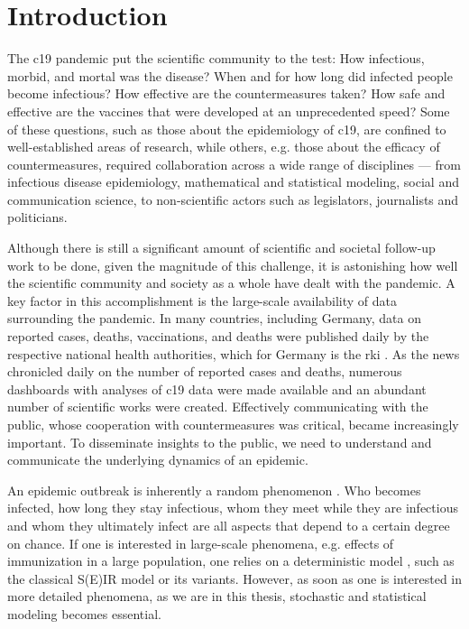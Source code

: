 \chapter{Introduction}
\label{cha:introduction}

The \gls{c19} pandemic put the scientific community to the test: How infectious, morbid, and mortal was the disease? When and for how long did infected people become infectious? How effective are the countermeasures taken? How safe and effective are the vaccines that were developed at an unprecedented speed? Some of these questions, such as those about the epidemiology of \acrshort{c19}, are confined to well-established areas of research, while others, e.g. those about the efficacy of countermeasures, required collaboration across a wide range of disciplines --- from infectious disease epidemiology, mathematical and statistical modeling, social and communication science, to non-scientific actors such as legislators, journalists and politicians.

Although there is still a significant amount of scientific and societal follow-up work to be done, given the magnitude of this challenge, it is astonishing how well the scientific community and society as a whole have dealt with the pandemic. A key factor in this accomplishment is the large-scale availability of data surrounding the pandemic. In many countries, including Germany, data on reported cases, deaths, vaccinations, and deaths were published daily by the respective national health authorities, which for Germany is the \gls{rki} \citep{RobertKoch-Institut2022SARSCoV2,RobertKoch-Institut2021COVID19Hospitalisierungen}.
As the news chronicled daily on the number of reported cases and deaths, numerous dashboards with analyses of \acrshort{c19} data were made available and an abundant number of scientific works were created. Effectively communicating with the public, whose cooperation with countermeasures was critical, became increasingly important. To disseminate insights to the public, we need to understand and communicate the underlying dynamics of an epidemic.

An epidemic outbreak is inherently a random phenomenon \citep{Diekmann2013Mathematical}. Who becomes infected, how long they stay infectious, whom they meet while they are infectious and whom they ultimately infect are all aspects that depend to a certain degree on chance. If one is interested in large-scale phenomena, e.g. effects of immunization in a large population, one relies on a deterministic model \citep{Britton2019Stochastic}, such as the classical S(E)IR model \citep{Kermack1927Contribution} or its variants. However, as soon as one is interested in more detailed phenomena, as we are in this thesis, stochastic and statistical modeling becomes essential. 

